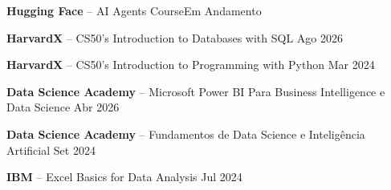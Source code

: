 \begin{zitemize}
\setlength{\itemsep}{0.2em}
\item \textbf{Hugging Face} – AI Agents Course\hfill Em Andamento
\item \textbf{HarvardX} – CS50's Introduction to Databases with SQL \hfill Ago 2026
\item \textbf{HarvardX} – CS50's Introduction to Programming with Python \hfill Mar 2024
\item \textbf{Data Science Academy} – 
Microsoft Power BI Para Business Intelligence e Data Science \hfill Abr 2026
\item \textbf{Data Science Academy} – Fundamentos de Data Science e Inteligência Artificial \hfill Set 2024
\item \textbf{IBM} – Excel Basics for Data Analysis \hfill Jul 2024
\end{zitemize}